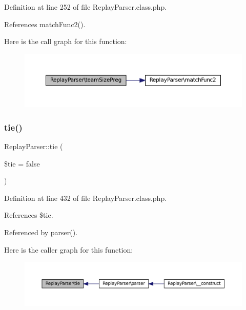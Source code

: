 Definition at line 252 of file Replay\+Parser.\+class.\+php.



References match\+Func2().

Here is the call graph for this function\+:\nopagebreak
\begin{figure}[H]
\begin{center}
\leavevmode
\includegraphics[width=350pt]{class_replay_parser_a46cb2149fb24bf3a9674c544caee3fcf_cgraph}
\end{center}
\end{figure}
\mbox{\label{class_replay_parser_a5556e8ef7ac8a632e073fc71efb6cbf4}} 
\subsubsection{\texorpdfstring{tie()}{tie()}}
{\footnotesize\ttfamily Replay\+Parser\+::tie (\begin{DoxyParamCaption}\item[{}]{\$tie = {\ttfamily false} }\end{DoxyParamCaption})}



Definition at line 432 of file Replay\+Parser.\+class.\+php.



References \$tie.



Referenced by parser().

Here is the caller graph for this function\+:\nopagebreak
\begin{figure}[H]
\begin{center}
\leavevmode
\includegraphics[width=350pt]{class_replay_parser_a5556e8ef7ac8a632e073fc71efb6cbf4_icgraph}
\end{center}
\end{figure}
\mbox{\label{class_replay_parser_a44e81699ecad590f46d29a99ece30a2e}} 
